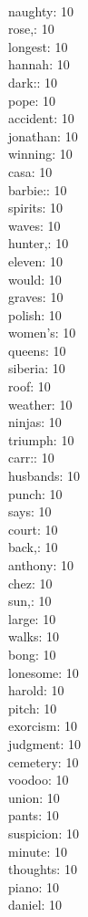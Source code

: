 \begin{multicols}{6}
  \\ naughty: 10
  \\ rose,: 10
  \\ longest: 10
  \\ hannah: 10
  \\ dark:: 10
  \\ pope: 10
  \\ accident: 10
  \\ jonathan: 10
  \\ winning: 10
  \\ casa: 10
  \\ barbie:: 10
  \\ spirits: 10
  \\ waves: 10
  \\ hunter,: 10
  \\ eleven: 10
  \\ would: 10
  \\ graves: 10
  \\ polish: 10
  \\ women's: 10
  \\ queens: 10
  \\ siberia: 10
  \\ roof: 10
  \\ weather: 10
  \\ ninjas: 10
  \\ triumph: 10
  \\ carr:: 10
  \\ husbands: 10
  \\ punch: 10
  \\ says: 10
  \\ court: 10
  \\ back,: 10
  \\ anthony: 10
  \\ chez: 10
  \\ sun,: 10
  \\ large: 10
  \\ walks: 10
  \\ bong: 10
  \\ lonesome: 10
  \\ harold: 10
  \\ pitch: 10
  \\ exorcism: 10
  \\ judgment: 10
  \\ cemetery: 10
  \\ voodoo: 10
  \\ union: 10
  \\ pants: 10
  \\ suspicion: 10
  \\ minute: 10
  \\ thoughts: 10
  \\ piano: 10
  \\ daniel: 10
  
\end{multicols}